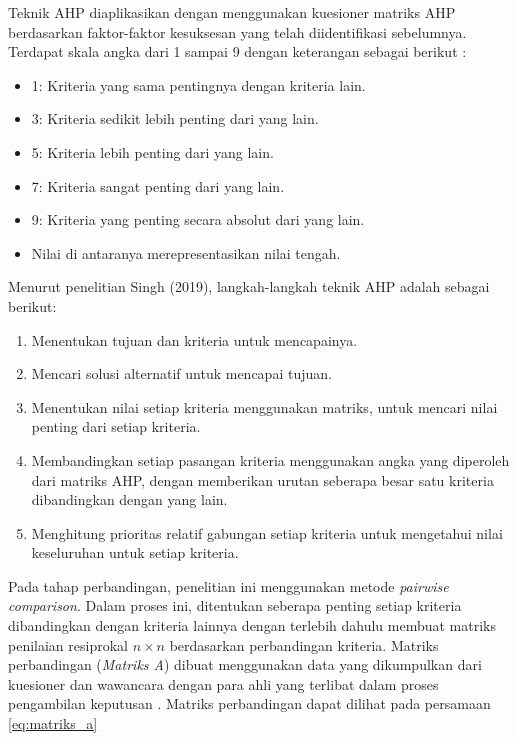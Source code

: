 \documentclass[journal,article,submit,pdftex,moreauthors]{Definitions/mdpi}
\begin{document}
Teknik AHP diaplikasikan dengan menggunakan kuesioner matriks AHP berdasarkan faktor-faktor kesuksesan yang telah diidentifikasi sebelumnya. Terdapat skala angka dari 1 sampai 9 dengan keterangan sebagai berikut \cite{Saaty1990}:
\begin{itemize}
    \item 1: Kriteria yang sama pentingnya dengan kriteria lain.
    \item 3: Kriteria sedikit lebih penting dari yang lain.
    \item 5: Kriteria lebih penting dari yang lain.
    \item 7: Kriteria sangat penting dari yang lain.
    \item 9: Kriteria yang penting secara absolut dari yang lain.
    \item Nilai di antaranya merepresentasikan nilai tengah.
\end{itemize}

Menurut penelitian Singh (2019), langkah-langkah teknik AHP adalah sebagai berikut:
\begin{enumerate}
    \item Menentukan tujuan dan kriteria untuk mencapainya.
    \item Mencari solusi alternatif untuk mencapai tujuan.
    \item Menentukan nilai setiap kriteria menggunakan matriks, untuk mencari nilai penting dari setiap kriteria.
    \item Membandingkan setiap pasangan kriteria menggunakan angka yang diperoleh dari matriks AHP, dengan memberikan urutan seberapa besar satu kriteria dibandingkan dengan yang lain.
    \item Menghitung prioritas relatif gabungan setiap kriteria untuk mengetahui nilai keseluruhan untuk setiap kriteria.
\end{enumerate}

Pada tahap perbandingan, penelitian ini menggunakan metode \textit{pairwise comparison}. Dalam proses ini, ditentukan seberapa penting setiap kriteria dibandingkan dengan kriteria lainnya dengan terlebih dahulu membuat matriks penilaian resiprokal $n \times n$ berdasarkan perbandingan kriteria. Matriks perbandingan (\textit{Matriks A}) dibuat menggunakan data yang dikumpulkan dari kuesioner dan wawancara dengan para ahli yang terlibat dalam proses pengambilan keputusan \cite{Singh2019}. Matriks perbandingan dapat dilihat pada persamaan \ref{eq:matriks_a}
\end{document}

